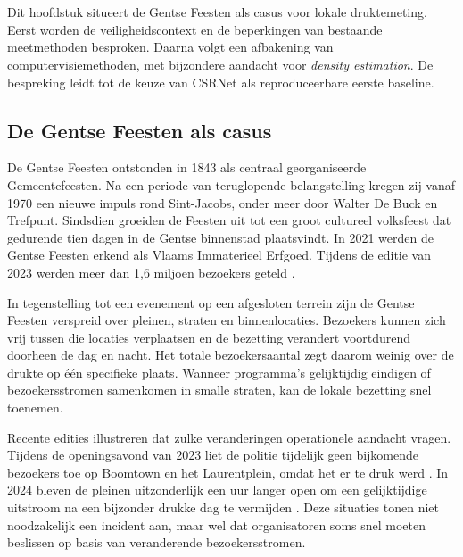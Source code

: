 \chapter{}%
\label{ch:stand-van-zaken}

Dit hoofdstuk situeert de Gentse Feesten als casus voor lokale druktemeting. Eerst worden de veiligheidscontext en de beperkingen van bestaande meetmethoden besproken. Daarna volgt een afbakening van computervisiemethoden, met bijzondere aandacht voor \emph{density estimation}. De bespreking leidt tot de keuze van CSRNet als reproduceerbare eerste baseline.

\section{De Gentse Feesten als casus}

De Gentse Feesten ontstonden in 1843 als centraal georganiseerde Gemeentefeesten. Na een periode van teruglopende belangstelling kregen zij vanaf 1970 een nieuwe impuls rond Sint-Jacobs, onder meer door Walter De Buck en Trefpunt. Sindsdien groeiden de Feesten uit tot een groot cultureel volksfeest dat gedurende tien dagen in de Gentse binnenstad plaatsvindt. In 2021 werden de Gentse Feesten erkend als Vlaams Immaterieel Erfgoed. Tijdens de editie van 2023 werden meer dan 1,6 miljoen bezoekers geteld \autocite{StadGentGeschiedenis}.

In tegenstelling tot een evenement op een afgesloten terrein zijn de Gentse Feesten verspreid over pleinen, straten en binnenlocaties. Bezoekers kunnen zich vrij tussen die locaties verplaatsen en de bezetting verandert voortdurend doorheen de dag en nacht. Het totale bezoekersaantal zegt daarom weinig over de drukte op één specifieke plaats. Wanneer programma's gelijktijdig eindigen of bezoekersstromen samenkomen in smalle straten, kan de lokale bezetting snel toenemen.

Recente edities illustreren dat zulke veranderingen operationele aandacht vragen. Tijdens de openingsavond van 2023 liet de politie tijdelijk geen bijkomende bezoekers toe op Boomtown en het Laurentplein, omdat het er te druk werd \autocite{Schouppe2023}. In 2024 bleven de pleinen uitzonderlijk een uur langer open om een gelijktijdige uitstroom na een bijzonder drukke dag te vermijden \autocite{Aneca2024}. Deze situaties tonen niet noodzakelijk een incident aan, maar wel dat organisatoren soms snel moeten beslissen op basis van veranderende bezoekersstromen.


